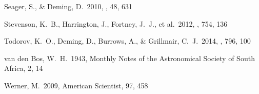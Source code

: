 \begin{thebibliography}{25}
 Seager, S., \& Deming, D.\ 2010, \araa, 48, 631

 Stevenson, K.~B., Harrington, J., Fortney, J.~J., et al.\ 2012, \apj, 754, 136

 Todorov, K.~O., Deming, D., Burrows, A., \& Grillmair, C.~J.\ 2014, \apj, 796, 100

 van den Bos, W.~H.\ 1943, Monthly Notes of the Astronomical Society of South Africa, 2, 14

 Werner, M.\ 2009, American Scientist, 97, 458

\end{thebibliography}
